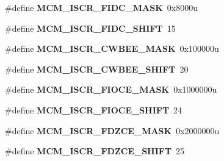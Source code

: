 \begin{DoxyCompactItemize}
\item 
\hypertarget{group___m_c_m___register___masks_gaeca36bf639a606a24f7ee6a4fc983528}{}\#define {\bfseries M\+C\+M\+\_\+\+I\+S\+C\+R\+\_\+\+F\+I\+D\+C\+\_\+\+M\+A\+S\+K}~0x8000u\label{group___m_c_m___register___masks_gaeca36bf639a606a24f7ee6a4fc983528}

\item 
\hypertarget{group___m_c_m___register___masks_gaaf16fcce0e380e7f200d910008794028}{}\#define {\bfseries M\+C\+M\+\_\+\+I\+S\+C\+R\+\_\+\+F\+I\+D\+C\+\_\+\+S\+H\+I\+F\+T}~15\label{group___m_c_m___register___masks_gaaf16fcce0e380e7f200d910008794028}

\item 
\hypertarget{group___m_c_m___register___masks_ga5126e40f871372619a6666e08d47c92c}{}\#define {\bfseries M\+C\+M\+\_\+\+I\+S\+C\+R\+\_\+\+C\+W\+B\+E\+E\+\_\+\+M\+A\+S\+K}~0x100000u\label{group___m_c_m___register___masks_ga5126e40f871372619a6666e08d47c92c}

\item 
\hypertarget{group___m_c_m___register___masks_ga86ca20382c7249f19834885e68a91fdf}{}\#define {\bfseries M\+C\+M\+\_\+\+I\+S\+C\+R\+\_\+\+C\+W\+B\+E\+E\+\_\+\+S\+H\+I\+F\+T}~20\label{group___m_c_m___register___masks_ga86ca20382c7249f19834885e68a91fdf}

\item 
\hypertarget{group___m_c_m___register___masks_gaf48976f7ac1761a6145eea9a6add5ff5}{}\#define {\bfseries M\+C\+M\+\_\+\+I\+S\+C\+R\+\_\+\+F\+I\+O\+C\+E\+\_\+\+M\+A\+S\+K}~0x1000000u\label{group___m_c_m___register___masks_gaf48976f7ac1761a6145eea9a6add5ff5}

\item 
\hypertarget{group___m_c_m___register___masks_ga97f10ab969b7c83eb9cde216807b215b}{}\#define {\bfseries M\+C\+M\+\_\+\+I\+S\+C\+R\+\_\+\+F\+I\+O\+C\+E\+\_\+\+S\+H\+I\+F\+T}~24\label{group___m_c_m___register___masks_ga97f10ab969b7c83eb9cde216807b215b}

\item 
\hypertarget{group___m_c_m___register___masks_ga2ad0b7495aba7dacde7658c2a71db6bd}{}\#define {\bfseries M\+C\+M\+\_\+\+I\+S\+C\+R\+\_\+\+F\+D\+Z\+C\+E\+\_\+\+M\+A\+S\+K}~0x2000000u\label{group___m_c_m___register___masks_ga2ad0b7495aba7dacde7658c2a71db6bd}

\item 
\hypertarget{group___m_c_m___register___masks_ga12ce128ef5d64154df362b12c33aa526}{}\#define {\bfseries M\+C\+M\+\_\+\+I\+S\+C\+R\+\_\+\+F\+D\+Z\+C\+E\+\_\+\+S\+H\+I\+F\+T}~25\label{group___m_c_m___register___masks_ga12ce128ef5d64154df362b12c33aa526}


\end{DoxyCompactItemize}
